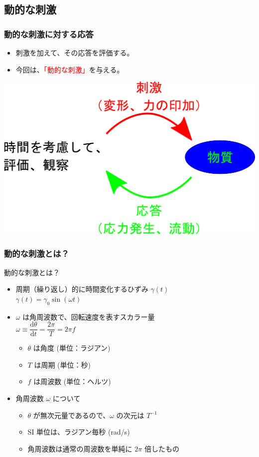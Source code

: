 \documentclass[12pt, dvipdfmx]{beamer}
\begin{document}
\subsection{動的な刺激}
\begin{frame}
	\frametitle{動的な刺激に対する応答}
	\begin{itemize}
		\item 刺激を加えて、その応答を評価する。
		\item 今回は、\textcolor{red}{「動的な刺激」}を与える。
	\end{itemize}

	\vspace{5mm}
			\centering
				\includegraphics[width=.75\textwidth]{Rheo_method.png}
\end{frame}

\begin{frame}
	\frametitle{動的な刺激とは？}
	\begin{block}{動的な刺激とは？}
		\begin{itemize}
			\item 周期（繰り返し）的に時間変化するひずみ $\gamma (t)$\\
			$\gamma (t) = \gamma_0 \sin(\omega t)$
			\item $\omega$ は角周波数で、回転速度を表すスカラー量\\
			$\omega \equiv \dfrac{\mathrm{d} \theta}{\mathrm{d} t} = \dfrac{2 \pi}{T} = 2\pi f$
			\begin{itemize}
				\item $\theta$ は角度 (単位：ラジアン)
				\item $T$ は周期 (単位：秒)
				\item $f$ は周波数 (単位：ヘルツ)
				
			\end{itemize}
			\item 角周波数 $\omega$ について
			\begin{itemize}
				\item $\theta$ が無次元量であるので、$\omega$ の次元は $T^{-1}$
				\item SI 単位は、ラジアン毎秒 (rad/s)
				\item 角周波数は通常の周波数を単純に $2\pi$ 倍したもの
			\end{itemize}
		\end{itemize}
	\end{block}

\end{frame}
\end{document}
